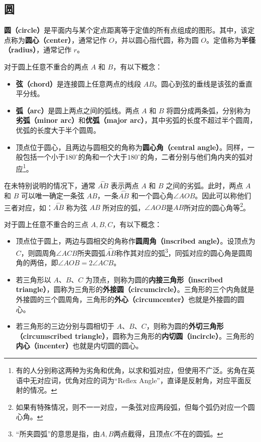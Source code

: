 \subsection{圆}

\textbf{圆（circle）}是平面内与某个定点距离等于定值的所有点组成的图形。其中，该定点称为\textbf{圆心（center）}，通常记作 $O$，并以圆心指代圆，称为圆 $O$。定值称为\textbf{半径（radius）}，通常记作 $r$。

对于圆上任意不重合的两点 $A$ 和 $B$，有以下概念：
\begin{itemize}
\item \textbf{弦（chord）}是连接圆上任意两点的线段 $AB$。圆心到弦的垂线是该弦的垂直平分线。
\item \textbf{弧（arc）}是圆上两点之间的弧线。两点 $A$ 和 $B$ 将圆分成两条弧，分别称为\textbf{劣弧（minor arc）}和\textbf{优弧（major arc）}，其中劣弧的长度不超过半个圆周，优弧的长度大于半个圆周。
\item 顶点位于圆心，且两边与圆相交的角称为\textbf{圆心角（central angle）}。同样，一般包括一个小于$180^\circ$的角和一个大于$180^\circ$的角，二者分别与他们角内夹的弧对应\footnote{有的人分别称这两种为劣角和优角，以求和弧对应，但使用不广泛。劣角在英语中无对应词，优角对应的词为“Reflex Angle”，直译是反射角，对应平面反射的情况。}。
\end{itemize}

在未特别说明的情况下，通常 $\overset{\frown}{AB}$ 表示两点 $A$ 和 $B$ 之间的劣弧。此时，两点 $A$ 和 $B$ 可以唯一确定一条弦 $AB$，一条$\overset{\frown}{AB}$ 和一个圆心角$\angle AOB$。因此可以称他们三者对应，如：$\overset{\frown}{AB}$ 称为弦 $AB$ 所对应的弧，$\angle AOB$是$AB$所对应的圆心角等\footnote{如果有特殊情况，则不一一对应，一条弦对应两段弧，但每个弧仍对应一个圆心角。}。

对于圆上任意不重合的三点 $A,B,C$，有以下概念：
\begin{itemize}
\item 顶点位于圆上，两边与圆相交的角称作\textbf{圆周角（inscribed angle）}。设顶点为$C$，则圆周角$\angle ACB$所夹圆弧$\overset{\frown}{AB}$称作其对应的弧\footnote{“所夹圆弧”的意思是指，由$A,B$两点截得，且顶点$C$不在的圆弧。}，同弧对应的圆心角是圆周角的两倍，即$\angle AOB=2\angle ACB$。
\item 若三角形以 $A$、$B$、$C$ 为顶点，则称为圆的\textbf{内接三角形（inscribed triangle）}，圆称为三角形的\textbf{外接圆（circumcircle）}。三角形的三个内角就是外接圆的三个圆周角，三角形的\textbf{外心（circumcenter）}也就是外接圆的圆心。
\item 若三角形的三边分别与圆相切于 $A$、$B$、$C$，则称为圆的\textbf{外切三角形（circumscribed triangle）}，圆称为三角形的\textbf{内切圆（incircle）}。三角形的\textbf{内心（incenter）}也就是内切圆的圆心。
\end{itemize}

